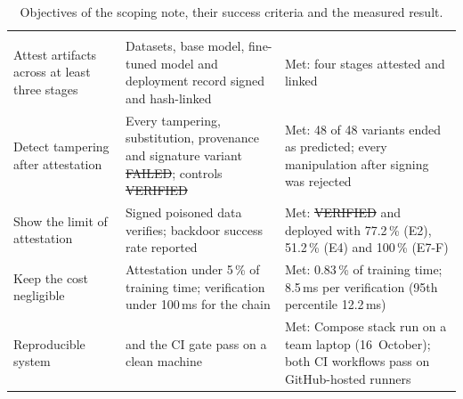{\tablefont
\begin{xltabular}{\textwidth}{P{3.1cm}P{4.5cm}L}
\caption{Objectives of the scoping note, their success criteria and the measured result.}\label{tab:criteria}\\
\toprule
\headrow{} &  &  \\
\midrule
\endfirsthead
\toprule
\headrow{} &  &  \\
\midrule
\endhead
\bottomrule
\endfoot
Attest artifacts across at least three stages & Datasets, base model, fine-tuned model and deployment record signed and hash-linked & Met: four stages attested and linked \\
Detect tampering after attestation & Every tampering, substitution, provenance and signature variant \st{FAILED}; controls \st{VERIFIED} & Met: 48 of 48 variants ended as predicted; every manipulation after signing was rejected \\
Show the limit of attestation & Signed poisoned data verifies; backdoor success rate reported & Met: \st{VERIFIED} and deployed with 77.2\,\% (E2), 51.2\,\% (E4) and 100\,\% (E7-F) \\
Keep the cost negligible & Attestation under 5\,\% of training time; verification under 100\,ms for the chain & Met: 0.83\,\% of training time; 8.5\,ms per verification (95th percentile 12.2\,ms) \\
Reproducible system &  and the CI gate pass on a clean machine & Met: Compose stack run on a team laptop (16~October); both CI workflows pass on GitHub-hosted runners \\
\end{xltabular}}
